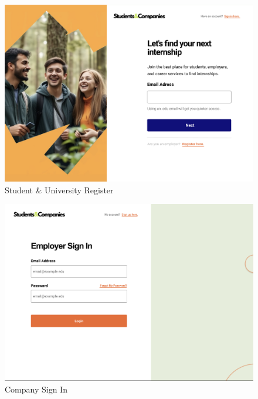 \documentclass{article}
\begin{document}
\begin{figure}[H]
    \centering
    \includegraphics[scale = 0.40]{figures/Student Register.png}
    \caption{Student \& University Register}
     \centering
\end{figure}

\begin{figure}[H]
    \centering
    \includegraphics[scale = 0.40]{figures/Employer Sign In.png}
    \caption{Company Sign In}
     \centering
\end{figure}
\end{document}
